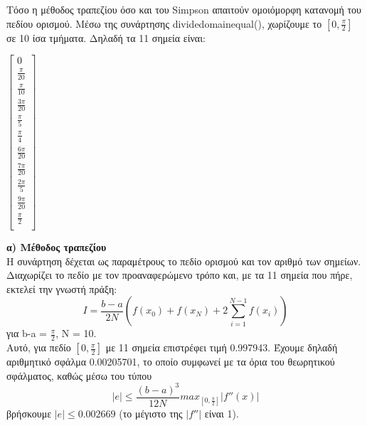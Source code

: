 \documentclass{article}
\newcommand{\lt}{\latintext}
\newcommand{\gt}{\greektext}
\begin{document}
\gt Τόσο η μέθοδος τραπεζίου όσο και του \lt Simpson \gt απαιτούν ομοιόμορφη κατανομή του πεδίου
\gt ορισμού. Μέσω της συνάρτησης \lt divide\textunderscore domain\textunderscore equal(),
\gt χωρίζουμε το $[0, \frac{\pi}{2}]$ σε 10 ίσα τμήματα. Δηλαδή τα 11 σημεία είναι:
\begin{center}
    $\begin{bmatrix}
        0              \\
        \frac{\pi}{20} \\
        \frac{\pi}{10} \\
        \frac{3\pi}{20}\\
        \frac{\pi}{5}  \\
        \frac{\pi}{4}  \\
        \frac{6\pi}{20}\\
        \frac{7\pi}{20}\\
        \frac{2\pi}{5} \\
        \frac{9\pi}{20}\\
        \frac{\pi}{2}  \\
    \end{bmatrix}$
\end{center}

\textbf{\gt α) Μέθοδος τραπεζίου}\\
\gt Η συνάρτηση δέχεται ως παραμέτρους το πεδίο ορισμού και τον αριθμό των σημείων.
\gt Διαχωρίζει το πεδίο με τον προαναφερώμενο τρόπο και, με τα 11 σημεία που πήρε,
\gt εκτελεί την γνωστή πράξη:
\begin{equation*}
    I = \frac{b - a}{2N}(f(x_0) + f(x_N) + 2\sum_{i=1}^{N-1}f(x_i))
\end{equation*}
\gt για \lt b-a = $\frac{\pi}{2}$, N = 10.\\
\gt Αυτό, για πεδίο $[0, \frac{\pi}{2}]$ με 11 σημεία επιστρέφει τιμή 0.997943.
\gt Έχουμε δηλαδή αριθμητικό σφάλμα 0.00205701, το οποίο συμφωνεί με τα όρια του
\gt θεωρητικού σφάλματος, καθώς μέσω του τύπου
\begin{equation*}
    |e| \leq \frac{(b - a)^3}{12N}max_{[0,\frac{\pi}{2}]}|f''(x)|
\end{equation*}
\gt βρήσκουμε $|e| \leq 0.002669$ (\gt το μέγιστο της \lt $|f''|$ \gt είναι 1).
\end{document}
